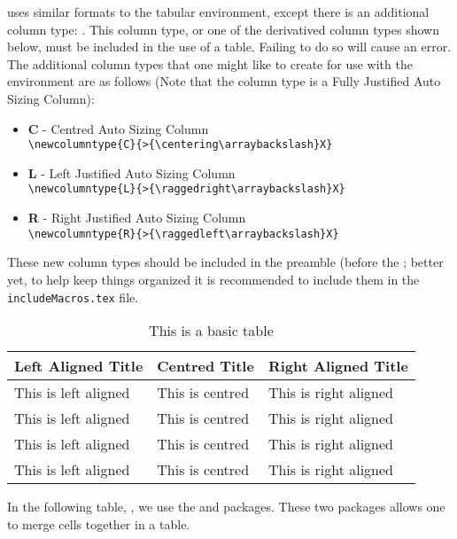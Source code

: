 		 uses similar formats to the tabular environment, except there is an additional column type: .
		This column type, or one of the derivatived column types shown below, must be included in the use of a  table. 
		Failing to do so will cause an error. The additional column types that one might like to create for use with the  environment are as follows (Note that the  column type is a Fully Justified Auto Sizing Column):
		\begin{itemize}
			\item \textbf{C} - Centred Auto Sizing Column\\\lstinline|\newcolumntype{C}{>{\centering\arraybackslash}X}|
			\item \textbf{L} - Left Justified Auto Sizing Column \\\lstinline|\newcolumntype{L}{>{\raggedright\arraybackslash}X}|
			\item \textbf{R} - Right Justified Auto Sizing Column \\\lstinline|\newcolumntype{R}{>{\raggedleft\arraybackslash}X}|
		\end{itemize}
  		These new column types should be included in the preamble (before the \lstinline||; better yet, to help keep things organized it is recommended to include them in the \verb|includeMacros.tex| file.
		\begin{table}[H]
			\caption{This is a basic table}
			\label{tab:basicTable}
			\centering
			\begin{tabularx}{0.75\textwidth}{LCR} 
				\toprule
					\textbf{Left Aligned Title} & \textbf{Centred Title} & \textbf{Right Aligned Title} \\
				\midrule
					This is left aligned & This is centred & This is right aligned\\
					This is left aligned & This is centred & This is right aligned\\
					This is left aligned & This is centred & This is right aligned\\
					This is left aligned & This is centred & This is right aligned\\
				\bottomrule
			\end{tabularx}
		\end{table}
		In the following table, , we use the  and  packages.
		These two packages allows one to merge cells together in a table.
